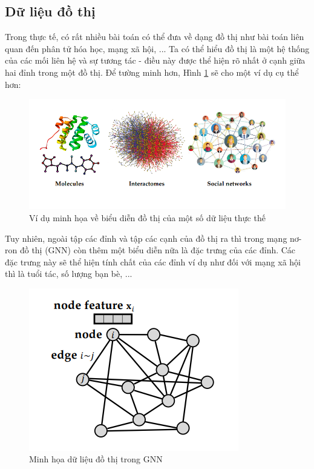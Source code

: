 \subsection{Dữ liệu đồ thị}
Trong thực tế, có rất nhiều bài toán có thể đưa về dạng đồ thị như bài toán liên quan đến phân tử hóa học, mạng xã hội, ... Ta có thể hiểu đồ thị là một hệ thống của các mối liên hệ và sự tương tác - điều này được thể hiện rõ nhất ở cạnh giữa hai đỉnh trong một đồ thị. Để tường minh hơn, Hình \ref{fig:vdgraph} sẽ cho một ví dụ cụ thể hơn:

\begin{figure}[H]
    \centering
    \includegraphics[width=0.7\linewidth]{Images/GDL/graph/graph_vd.png}
    \caption{Ví dụ minh họa về biểu diễn đồ thị của một số dữ liệu thực thế\cite{geometricdeep2022}}
    \label{fig:vdgraph}
\end{figure}

Tuy nhiên, ngoài tập các đỉnh và tập các cạnh của đồ thị ra thì trong mạng nơ-ron đồ thị (GNN) còn thêm một biểu diễn nữa là đặc trưng của các đỉnh. Các đặc trưng này sẽ thể hiện tính chất của các đỉnh ví dụ như đối với mạng xã hội thì là tuổi tác, số lượng bạn bè, ...

\begin{figure}[H]
    \centering
    \includegraphics[width=0.7\linewidth]{Images/GDL/graph/graph_represent.png}
    \caption{Minh họa dữ liệu đồ thị trong GNN\cite{geometricdeep2022}}
\end{figure}


